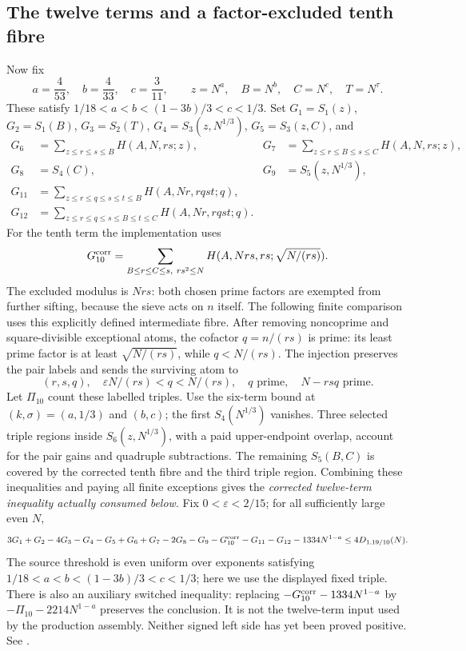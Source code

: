 \subsection{The twelve terms and a factor-excluded tenth fibre}
Now fix
\[
 a=\frac4{53},\quad b=\frac4{33},\quad c=\frac3{11},\qquad
 z=N^a,\quad B=N^b,\quad C=N^c,\quad T=N^\tau.
\]
These satisfy $1/18<a<b<(1-3b)/3<c<1/3$.
Set $G_1=S_1(z)$, $G_2=S_1(B)$, $G_3=S_2(T)$,
$G_4=S_3(z,N^{1/3})$, $G_5=S_3(z,C)$, and
\begin{align*}
 G_6&=\sum_{z\le r\le s\le B}H(A,N,rs;z),&
 G_7&=\sum_{z\le r\le B\le s\le C}H(A,N,rs;z),\\
 G_8&=S_4(C),&G_9&=S_5(z,N^{1/3}),\\
 G_{11}&=\sum_{z\le r\le q\le s\le t\le B}H(A,Nr,rqst;q),\\
 G_{12}&=\sum_{z\le r\le q\le s\le B\le t\le C}H(A,Nr,rqst;q).
\end{align*}
For the tenth term the implementation uses
\[
 G_{10}^{\rm corr}=\sum_{B\le r\le C\le s,\ rs^2\le N}
 H(A,Nrs,rs;\sqrt{N/(rs)}).
\]
The excluded modulus is $Nrs$: both chosen prime factors are exempted from further sifting, because the sieve acts on $n$ itself. The following finite comparison uses this explicitly defined intermediate fibre.
After removing noncoprime and square-divisible exceptional atoms, the
cofactor $q=n/(rs)$ is prime: its least prime factor is at least
$\sqrt{N/(rs)}$, while $q<N/(rs)$.
The injection preserves the pair labels and sends the surviving atom to
\[
 (r,s,q),\quad \varepsilon N/(rs)<q<N/(rs),\quad
 q\text{ prime},\quad N-rsq\text{ prime}.
\]
Let $\Pi_{10}$ count these labelled triples.
Use the six-term bound at $(k,\sigma)=(a,1/3)$ and $(b,c)$;
the first $S_4(N^{1/3})$ vanishes.  Three selected triple regions inside
$S_6(z,N^{1/3})$, with a paid upper-endpoint overlap, account for the
pair gains and quadruple subtractions.  The remaining $S_5(B,C)$ is
covered by the corrected tenth fibre and the third triple region.
Combining these inequalities and paying all finite exceptions gives the
\emph{corrected twelve-term inequality actually consumed below}.  Fix
$0<\varepsilon<2/15$; for all sufficiently large even $N$,
\[
 3G_1+G_2-4G_3-G_4-G_5+G_6+G_7-2G_8-G_9
 -G_{10}^{\rm corr}-G_{11}-G_{12}-1334N^{1-a}
 \le4D_{1,19/10}(N).
\]
The source threshold is even uniform over exponents satisfying
$1/18<a<b<(1-3b)/3<c<1/3$; here we use the displayed fixed triple.
There is also an auxiliary switched inequality: replacing
$-G_{10}^{\rm corr}-1334N^{1-a}$ by
$-\Pi_{10}-2214N^{1-a}$ preserves the conclusion.
It is not the twelve-term input used by the production assembly.
Neither signed left side has yet been proved positive.
See .
